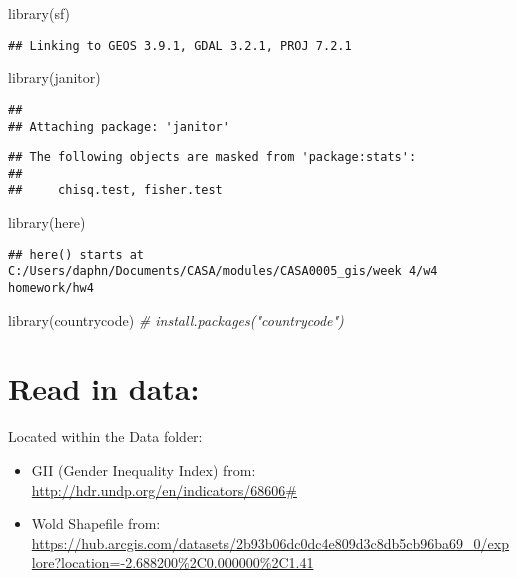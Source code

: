 \documentclass[
]{article}
\newenvironment{Shaded}{\begin{snugshade}}{\end{snugshade}}
\newcommand{\CommentTok}[1]{\textcolor[rgb]{0.56,0.35,0.01}{\textit{#1}}}
\newcommand{\FunctionTok}[1]{\textcolor[rgb]{0.00,0.00,0.00}{#1}}
\newcommand{\NormalTok}[1]{#1}
\providecommand{\tightlist}{%
  \setlength{\itemsep}{0pt}\setlength{\parskip}{0pt}}
\begin{document}
\begin{Shaded}
\begin{Highlighting}[]
\FunctionTok{library}\NormalTok{(sf)}
\end{Highlighting}
\end{Shaded}

\begin{verbatim}
## Linking to GEOS 3.9.1, GDAL 3.2.1, PROJ 7.2.1
\end{verbatim}

\begin{Shaded}
\begin{Highlighting}[]
\FunctionTok{library}\NormalTok{(janitor)}
\end{Highlighting}
\end{Shaded}

\begin{verbatim}
## 
## Attaching package: 'janitor'
\end{verbatim}

\begin{verbatim}
## The following objects are masked from 'package:stats':
## 
##     chisq.test, fisher.test
\end{verbatim}

\begin{Shaded}
\begin{Highlighting}[]
\FunctionTok{library}\NormalTok{(here)}
\end{Highlighting}
\end{Shaded}

\begin{verbatim}
## here() starts at C:/Users/daphn/Documents/CASA/modules/CASA0005_gis/week 4/w4 homework/hw4
\end{verbatim}

\begin{Shaded}
\begin{Highlighting}[]
\FunctionTok{library}\NormalTok{(countrycode)}
\CommentTok{\# install.packages("countrycode")}
\end{Highlighting}
\end{Shaded}

\hypertarget{read-in-data}{%
\section{Read in data:}\label{read-in-data}}

Located within the Data folder:

\begin{itemize}
\tightlist
\item
  GII (Gender Inequality Index) from:
  \url{http://hdr.undp.org/en/indicators/68606\#}
\item
  Wold Shapefile from:
  \url{https://hub.arcgis.com/datasets/2b93b06dc0dc4e809d3c8db5cb96ba69_0/explore?location=-2.688200\%2C0.000000\%2C1.41}
\end{itemize}
\end{document}
